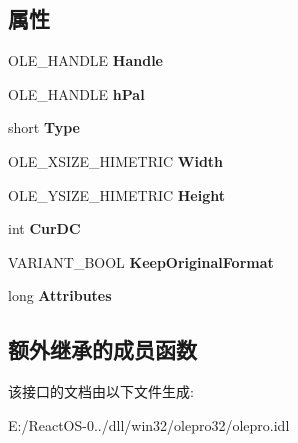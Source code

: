 \subsection*{属性}
\begin{DoxyCompactItemize}
\item 
\mbox{\label{interface_std_type_1_1_i_picture_a9c412a7dbb0b8b75d0a111357147dda5}} 
O\+L\+E\+\_\+\+H\+A\+N\+D\+LE {\bfseries Handle}
\item 
\mbox{\label{interface_std_type_1_1_i_picture_a3ea6c4c8b2aebef35f4dcd4b00a02731}} 
O\+L\+E\+\_\+\+H\+A\+N\+D\+LE {\bfseries h\+Pal}
\item 
\mbox{\label{interface_std_type_1_1_i_picture_a7a6674270e47ed64a2bbb7122387ca8e}} 
short {\bfseries Type}
\item 
\mbox{\label{interface_std_type_1_1_i_picture_adb0777a9599bc3c450bacf0452ef419e}} 
O\+L\+E\+\_\+\+X\+S\+I\+Z\+E\+\_\+\+H\+I\+M\+E\+T\+R\+IC {\bfseries Width}
\item 
\mbox{\label{interface_std_type_1_1_i_picture_ae7e1508af586ee51da05cc7436bee1db}} 
O\+L\+E\+\_\+\+Y\+S\+I\+Z\+E\+\_\+\+H\+I\+M\+E\+T\+R\+IC {\bfseries Height}
\item 
\mbox{\label{interface_std_type_1_1_i_picture_aa436e087407576532af3fb941d5f297f}} 
int {\bfseries Cur\+DC}
\item 
\mbox{\label{interface_std_type_1_1_i_picture_a9c8c5b7aa710ce5efed4f975a81d17fb}} 
V\+A\+R\+I\+A\+N\+T\+\_\+\+B\+O\+OL {\bfseries Keep\+Original\+Format}
\item 
\mbox{\label{interface_std_type_1_1_i_picture_a806764d13a764bae1dba0aa9f481ddf3}} 
long {\bfseries Attributes}
\end{DoxyCompactItemize}
\subsection*{额外继承的成员函数}


该接口的文档由以下文件生成\+:\begin{DoxyCompactItemize}
\item 
E\+:/\+React\+O\+S-\/0../dll/win32/olepro32/olepro.\+idl\end{DoxyCompactItemize}
